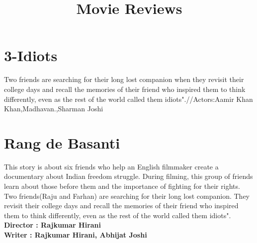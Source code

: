 \documentclass{article}
\title{Movie Reviews}
\begin{document}
	\maketitle
	\section{3-Idiots}
	\large{Two friends are searching for their long lost companion when they revisit their college days and recall the memories of their friend who inspired them to think differently, even as the rest of the world called them idiots".//Actors:Aamir Khan Khan,Madhavan.,Sharman Joshi}
	\section{Rang de Basanti}
	\large{This story is about six friends who help an English filmmaker create a documentary about Indian freedom struggle. During filming, this group of friends learn about those before them and the importance of fighting for their rights.}
	\large{Two friends(Raju and Farhan) are searching for their long lost companion. They revisit their college days and recall the memories of their friend who inspired them to think differently, even as the rest of the world called them idiots".}
\\
\textbf{Director : Rajkumar Hirani}
\\
\textbf{Writer : Rajkumar Hirani, Abhijat Joshi} %
\end{document}
